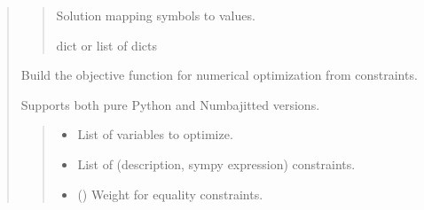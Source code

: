 \documentclass[letterpaper,10pt,english]{sphinxmanual}
\begin{document}
\begin{quote}
\begin{fulllineitems}
\begin{fulllineitems}
\begin{quote}
\begin{description}
\sphinxAtStartPar
Solution mapping symbols to values.

\sphinxAtStartPar
dict or list of dicts

\end{description}\end{quote}

\end{fulllineitems}


\begin{fulllineitems}
\label{\detokenize{pygeox:pygeox.solver.SolverNamespace.get_objective_function}}
\pysigstartsignatures
\pysiglinewithargsret
{}
{\sphinxparamcomma {}\sphinxparamcomma {}\sphinxparamcomma {}\sphinxparamcomma {}\sphinxparamcomma {}\sphinxparamcomma {}}
{}
\pysigstopsignatures
\sphinxAtStartPar
Build the objective function for numerical optimization from constraints.

\sphinxAtStartPar
Supports both pure Python and Numba\sphinxhyphen{}jitted versions.
\begin{quote}\begin{description}
\begin{itemize}
\item {} 
\sphinxAtStartPar
{} \textendash{} List of variables to optimize.

\item {} 
\sphinxAtStartPar
{} \textendash{} List of (description, sympy expression) constraints.

\item {} 
\sphinxAtStartPar
{} () \textendash{} Weight for equality constraints.


\end{itemize}
\end{description}
\end{quote}
\end{fulllineitems}
\end{fulllineitems}
\end{quote}
\end{document}
